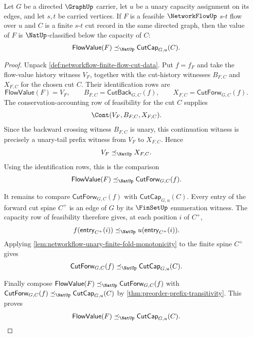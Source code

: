 \begin{theorem}
\label{thm:networkflow-weak-duality-cuts}
Let $G$ be a directed $\GraphUp$ carrier, let $u$ be a unary capacity assignment on its edges, and let $s,t$ be carried vertices. If $F$ is a feasible $\NetworkFlowUp$ $s$-$t$ flow over $u$ and $C$ is a finite $s$-$t$ cut record in the same directed graph, then the value of $F$ is $\NatUp$-classified below the capacity of $C$:
$$
\mathsf{FlowValue}(F)\preceq_{\NatUp}\mathsf{CutCap}_{G,u}(C).
$$
\end{theorem}
\begin{proof}
Unpack \autoref{def:networkflow-finite-flow-cut-data}. Put $f=f_F$ and take the flow-value history witness $V_F$, together with the cut-history witnesses $B_{F,C}$ and $X_{F,C}$ for the chosen cut $C$. Their identification rows are
$$
\mathsf{FlowValue}(F)=V_F,
\qquad
B_{F,C}=\mathsf{CutBack}_{G,C}(f),
\qquad
X_{F,C}=\mathsf{CutForw}_{G,C}(f).
$$
The conservation-accounting row of feasibility for the cut $C$ supplies
$$
\Cont(V_F,B_{F,C},X_{F,C}).
$$
Since the backward crossing witness $B_{F,C}$ is unary, this continuation witness is precisely a unary-tail prefix witness from $V_F$ to $X_{F,C}$. Hence
$$
V_F\preceq_{\NatUp}X_{F,C}.
$$
Using the identification rows, this is the comparison
$$
\mathsf{FlowValue}(F)\preceq_{\NatUp}\mathsf{CutForw}_{G,C}(f).
$$

It remains to compare $\mathsf{CutForw}_{G,C}(f)$ with $\mathsf{CutCap}_{G,u}(C)$. Every entry of the forward cut spine $C^{+}$ is an edge of $G$ by its $\FinSetUp$ enumeration witness. The capacity row of feasibility therefore gives, at each position $i$ of $C^{+}$,
$$
f(\mathsf{entry}_{C^{+}}(i))\preceq_{\NatUp}u(\mathsf{entry}_{C^{+}}(i)).
$$
Applying \autoref{lem:networkflow-unary-finite-fold-monotonicity} to the finite spine $C^{+}$ gives
$$
\mathsf{CutForw}_{G,C}(f)\preceq_{\NatUp}\mathsf{CutCap}_{G,u}(C).
$$

Finally compose $\mathsf{FlowValue}(F)\preceq_{\NatUp}\mathsf{CutForw}_{G,C}(f)$ with $\mathsf{CutForw}_{G,C}(f)\preceq_{\NatUp}\mathsf{CutCap}_{G,u}(C)$ by \autoref{thm:preorder-prefix-transitivity}. This proves
$$
\mathsf{FlowValue}(F)\preceq_{\NatUp}\mathsf{CutCap}_{G,u}(C).
$$
\end{proof}

